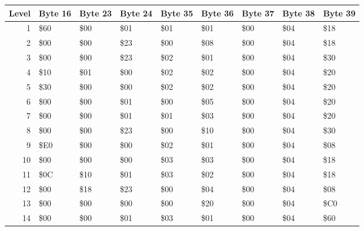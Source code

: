 \begin{figure}[H]
  {
  \setlength{\tabcolsep}{3.0pt}
  \setlength\cmidrulewidth{\heavyrulewidth} %
  \begin{adjustbox}{width=\textwidth}

\begin{tabular}{rllllllll}
\toprule
   Level & Byte 16   & Byte 23   & Byte 24   & Byte 35   & Byte 36   & Byte 37   & Byte 38   & Byte 39   \\
\midrule
       1 & \$60       & \$00       & \$01       & \$01       & \$01       & \$00       & \$04       & \$18       \\
       2 & \$00       & \$00       & \$23       & \$00       & \$08       & \$00       & \$04       & \$18       \\
       3 & \$00       & \$00       & \$23       & \$02       & \$01       & \$00       & \$04       & \$30       \\
       4 & \$10       & \$01       & \$00       & \$02       & \$02       & \$00       & \$04       & \$20       \\
       5 & \$30       & \$00       & \$00       & \$02       & \$02       & \$00       & \$04       & \$20       \\
       6 & \$00       & \$00       & \$01       & \$00       & \$05       & \$00       & \$04       & \$20       \\
       7 & \$00       & \$00       & \$01       & \$01       & \$03       & \$00       & \$04       & \$20       \\
       8 & \$00       & \$00       & \$23       & \$00       & \$10       & \$00       & \$04       & \$30       \\
       9 & \$E0       & \$00       & \$00       & \$02       & \$01       & \$00       & \$04       & \$08       \\
      10 & \$00       & \$00       & \$00       & \$03       & \$03       & \$00       & \$04       & \$18       \\
      11 & \$0C       & \$10       & \$01       & \$03       & \$02       & \$00       & \$04       & \$18       \\
      12 & \$00       & \$18       & \$23       & \$00       & \$04       & \$00       & \$04       & \$08       \\
      13 & \$00       & \$00       & \$00       & \$00       & \$20       & \$00       & \$04       & \$C0       \\
      14 & \$00       & \$00       & \$01       & \$03       & \$01       & \$00       & \$04       & \$60       \\

\end{tabular}
\end{adjustbox}}
\end{figure}
